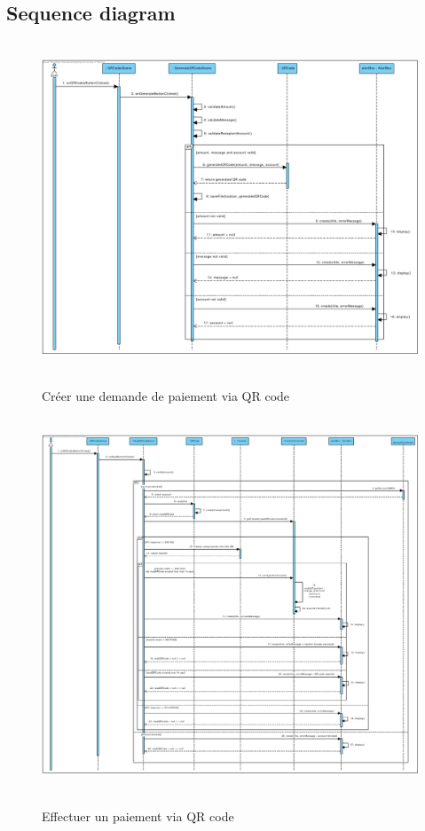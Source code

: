 \documentclass[]{report}
\begin{document}
\newpage

\subsection{Sequence diagram}

\begin{figure}[h!]
\hbox{
	\centering\includegraphics[width=\linewidth]{img/Sequence 1 - Extension 6.pdf}
}
\caption{Créer une demande de paiement via QR code}
\end{figure}

\newpage

\begin{figure}[h!]
\hbox{
	\centering\includegraphics[width=\linewidth]{img/Sequence 2 - Extension 6.pdf}
}
\caption{Effectuer un paiement via QR code}
\end{figure}
\end{document}
